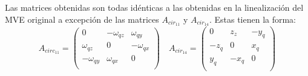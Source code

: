 \documentclass[main]{subfiles}
\begin{document}
Las matrices obtenidas son todas id\'enticas a las obtenidas en la linealizaci\'on del MVE original a excepci\'on de las matrices $A_{cir_{11}}$ y $A_{cir_{14}}$. Estas tienen la forma:
\begin{equation}
A_{circ_{11}}=\left(\begin{array}{ccc}
0 & -\omega_{qz} & \omega_{qy} \\
\omega_{qz} & 0 & -\omega_{qx}\\
-\omega_{qy} & \omega_{qx} &0\\

\end{array}\right) \quad 
A_{cir_{14}}=\left(\begin{array}{ccc}
0 & z_{z} & -y_{q} \\
-z_{q} & 0 & x_{q}\\
y_{q} & -x_{q} &0\\
\end{array}\right)
\end{equation}
\end{document}

